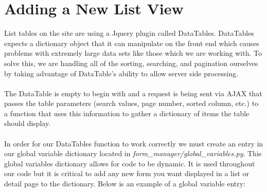 \documentclass{article}
\begin{document}
\section{Adding a New List View}
List tables on the site are using a Jquery plugin called DataTables.  DataTables expects a dictionary object that it can manipulate on the front end which causes problems with extremely large data sets like those which we are working with. To solve this, we are handling all of the sorting, searching, and pagination ourselves by taking advantage of DataTable's ability to allow server side processing.
\\\\The DataTable is empty to begin with and a request is being sent via AJAX that passes the table parameters (search values, page number, sorted column, etc.) to a function that uses this information to gather a dictionary of items the table should display.
\\\\In order for our DataTables function to work correctly we must create an entry in our global variable dictionary located in \textit{form\_manager/global\_variables.py}.  This global variables dictionary allows for code to be dynamic.  It is used throughout our code but it is critical to add any new form you want displayed in a list or detail page to the dictionary.  Below is an example of a global variable entry:
\end{document}
